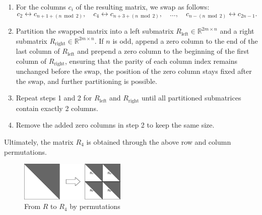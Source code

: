 \documentclass[12pt]{article}
\numberwithin{equation}{section}
\begin{document}
\begin{enumerate}
\item For the columns \( c_i \) of the resulting matrix, we swap as follows:  
   \begin{equation} \label{eq:cswap}
       c_2 \leftrightarrow c_{n + 1 + (n \bmod 2)}, \quad c_4 \leftrightarrow c_{n + 3 + (n \bmod 2)}, \quad \dots, \quad c_{n - (n \bmod 2)} \leftrightarrow c_{2n - 1}.
   \end{equation}  
\item  Partition the swapped matrix into a left submatrix \( R_{\text{left}} \in \mathbb{R}^{2m \times n} \)  and a right submatrix \( R_{\text{right}} \in \mathbb{R}^{2m \times n} \). If \( n \) is odd, append a zero column to the end of the last column of \( R_{\text{left}} \) and prepend a zero column to the beginning of the first column of \( R_{\text{right}} \), ensuring that the parity of each column index remains unchanged before the swap, the position of the zero column stays fixed after the swap, and further partitioning is possible.  
 
\item  Repeat steps 1 and 2 for \( R_{\text{left}} \) and \( R_{\text{right}} \) until all partitioned submatrices contain exactly 2 columns. 
 
\item Remove the added zero columns in step 2 to keep the same size.
\end{enumerate}


 Ultimately, the matrix \( R_4 \) is obtained through the above row and column permutations.

\begin{figure}[htbp]
        \centering
        \includegraphics[width=0.45\textwidth,keepaspectratio=true]{Figure_1.png} %
        \caption{From $R$ to $R_4$ by permutations }
        \label{fig:Figure_1}
\end{figure}
\end{document}
